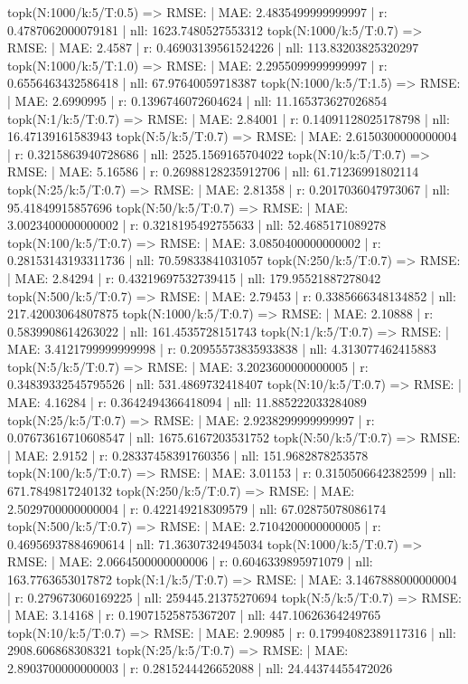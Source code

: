 topk(N:1000/k:5/T:0.5) => RMSE: | MAE: 2.4835499999999997 | r: 0.4787062000079181 | nll: 1623.7480527553312
topk(N:1000/k:5/T:0.7) => RMSE: | MAE: 2.4587 | r: 0.46903139561524226 | nll: 113.83203825320297
topk(N:1000/k:5/T:1.0) => RMSE: | MAE: 2.2955099999999997 | r: 0.6556463432586418 | nll: 67.97640059718387
topk(N:1000/k:5/T:1.5) => RMSE: | MAE: 2.6990995 | r: 0.1396746072604624 | nll: 11.165373627026854
topk(N:1/k:5/T:0.7) => RMSE: | MAE: 2.84001 | r: 0.14091128025178798 | nll: 16.47139161583943
topk(N:5/k:5/T:0.7) => RMSE: | MAE: 2.6150300000000004 | r: 0.3215863940728686 | nll: 2525.1569165704022
topk(N:10/k:5/T:0.7) => RMSE: | MAE: 5.16586 | r: 0.26988128235912706 | nll: 61.71236991802114
topk(N:25/k:5/T:0.7) => RMSE: | MAE: 2.81358 | r: 0.2017036047973067 | nll: 95.41849915857696
topk(N:50/k:5/T:0.7) => RMSE: | MAE: 3.0023400000000002 | r: 0.3218195492755633 | nll: 52.4685171089278
topk(N:100/k:5/T:0.7) => RMSE: | MAE: 3.0850400000000002 | r: 0.28153143193311736 | nll: 70.59833841031057
topk(N:250/k:5/T:0.7) => RMSE: | MAE: 2.84294 | r: 0.43219697532739415 | nll: 179.95521887278042
topk(N:500/k:5/T:0.7) => RMSE: | MAE: 2.79453 | r: 0.3385666348134852 | nll: 217.42003064807875
topk(N:1000/k:5/T:0.7) => RMSE: | MAE: 2.10888 | r: 0.5839908614263022 | nll: 161.4535728151743
topk(N:1/k:5/T:0.7) => RMSE: | MAE: 3.4121799999999998 | r: 0.20955573835933838 | nll: 4.313077462415883
topk(N:5/k:5/T:0.7) => RMSE: | MAE: 3.2023600000000005 | r: 0.34839332545795526 | nll: 531.4869732418407
topk(N:10/k:5/T:0.7) => RMSE: | MAE: 4.16284 | r: 0.3642494366418094 | nll: 11.885222033284089
topk(N:25/k:5/T:0.7) => RMSE: | MAE: 2.9238299999999997 | r: 0.07673616710608547 | nll: 1675.6167203531752
topk(N:50/k:5/T:0.7) => RMSE: | MAE: 2.9152 | r: 0.28337458391760356 | nll: 151.9682878253578
topk(N:100/k:5/T:0.7) => RMSE: | MAE: 3.01153 | r: 0.3150506642382599 | nll: 671.7849817240132
topk(N:250/k:5/T:0.7) => RMSE: | MAE: 2.5029700000000004 | r: 0.422149218309579 | nll: 67.02875078086174
topk(N:500/k:5/T:0.7) => RMSE: | MAE: 2.7104200000000005 | r: 0.46956937884690614 | nll: 71.36307324945034
topk(N:1000/k:5/T:0.7) => RMSE: | MAE: 2.0664500000000006 | r: 0.6046339895971079 | nll: 163.7763653017872
topk(N:1/k:5/T:0.7) => RMSE: | MAE: 3.1467888000000004 | r: 0.279673060169225 | nll: 259445.21375270694
topk(N:5/k:5/T:0.7) => RMSE: | MAE: 3.14168 | r: 0.19071525875367207 | nll: 447.10626364249765
topk(N:10/k:5/T:0.7) => RMSE: | MAE: 2.90985 | r: 0.17994082389117316 | nll: 2908.606868308321
topk(N:25/k:5/T:0.7) => RMSE: | MAE: 2.8903700000000003 | r: 0.2815244426652088 | nll: 24.44374455472026
